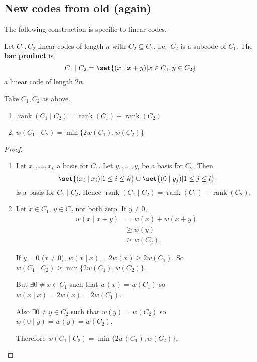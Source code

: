 \documentclass{article}
\newcommand{\barP}{\mid}
\newcommand{\1}[1]{\mathbbm{1}_{#1}}
\DeclareMathOperator{\rank}{rank}
\begin{document}
\subsection{New codes from old (again)}
The following construction is specific to linear codes.
\begin{defi}
    Let $C_1, C_2$ linear codes of length $n$ with $C_2 \subseteq C_1$, i.e.\ $C_2$ is a subcode of $C_1$. The \textbf{bar product} is
    \begin{equation*}
        C_1 \barP C_2 = \set{(x \barP x+y) | x \in C_1, y \in C_2}
    \end{equation*}
    a linear code of length $2n$.
\end{defi}
\begin{nlemma}\label{lem:2.25}
    Take $C_1, C_2$ as above.
    \begin{enumerate}[label=(\roman*)]
        \item $\rank(C_1 \barP C_2) = \rank(C_1) + \rank(C_2)$
        \item $w(C_1 \barP C_2) = \min \{ 2 w(C_1), w(C_2) \}$
    \end{enumerate}
\end{nlemma}
\begin{proof}\leavevmode
    \begin{enumerate}[label=(\roman*)]
        \item Let $x_1, \dotsc, x_k$ a basis for $C_1$.
            Let $y_1, \dotsc, y_l$ be a basis for $C_2$.
            Then \begin{equation*}\set{(x_i \barP x_i) | 1 \leq i \leq k} \cup \set{(0 \barP y_j) | 1 \leq j \leq l}\end{equation*} is a basis for $C_1 \barP C_2$.
            Hence $\rank(C_1 \barP C_2) = \rank(C_1) + \rank(C_2)$.
        \item Let $x \in C_1$, $y \in C_2$ not both zero.
            If $y \neq 0$,
            \begin{align*}w(x \barP x+y) &= w(x) + w(x+y)\\ &\geq w(y)\\ &\geq w(C_2).\end{align*}

            If $y = 0$ ($x \neq 0$), $w(x \barP x) = 2w(x) \geq 2w(C_1)$.
            So $w(C_1 \barP C_2) \geq \min\{2 w(C_1), w(C_2)\}$.

            But $\exists 0 \neq x \in C_1$ such that $w(x) = w(C_1)$ so $w(x \barP x) = 2 w(x) = 2 w(C_1)$.

            Also $\exists 0 \neq y \in C_2$ such that $w(y) = w(C_2)$ so $w(0 \barP y) = w(y) = w(C_2)$.

            Therefore $w(C_1 \barP C_2) = \min\{2 w(C_1), w(C_2)\}$. \qedhere
    \end{enumerate}
\end{proof}
\end{document}
